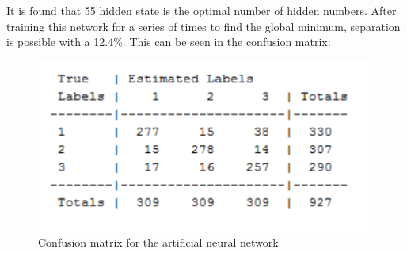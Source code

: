 It is found that 55 hidden state is the optimal number of hidden numbers. After training this network for a series of times to find the global minimum, separation is possible with a 12.4\%. This can be seen in the confusion matrix: 

\begin{figure}[H]
\centering
\includegraphics[scale=0.8]{billeder/conmatnn}
\caption{Confusion matrix for the artificial neural network }
\label{fig:conmatnn}
\end{figure}
